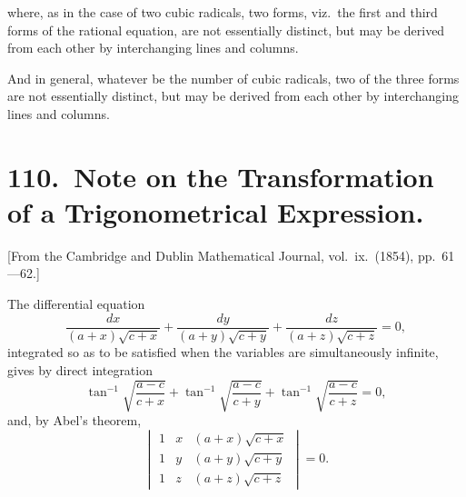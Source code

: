 \documentclass[11pt,a4paper]{article}
\theoremstyle{plain}
\begin{document}
where, as in the case of two cubic radicals, two forms, viz.\ the first and third forms of the rational equation, are not essentially distinct, but may be derived from each other by interchanging lines and columns.

And in general, whatever be the number of cubic radicals, two of the three forms are not essentially distinct, but may be derived from each other by interchanging lines and columns.
\clearpage


\section*{110.\ Note on the Transformation of a Trigonometrical Expression.}

[From the Cambridge and Dublin Mathematical Journal, vol.\ ix.\ (1854), pp.\ 61---62.]

\bigskip

The differential equation
\[\frac{dx}{(a+x)\sqrt{c+x}} + \frac{dy}{(a+y)\sqrt{c+y}} + \frac{dz}{(a+z)\sqrt{c+z}} = 0,\]
integrated so as to be satisfied when the variables are simultaneously infinite, gives by direct integration
\[\tan^{-1}\sqrt{\frac{a-c}{c+x}} + \tan^{-1}\sqrt{\frac{a-c}{c+y}} + \tan^{-1}\sqrt{\frac{a-c}{c+z}} = 0,\]
and, by Abel's theorem,
\[
\begin{vmatrix}
1 & x & (a+x)\sqrt{c+x} \\
1 & y & (a+y)\sqrt{c+y} \\
1 & z & (a+z)\sqrt{c+z}
\end{vmatrix} = 0.
\]
\end{document}
